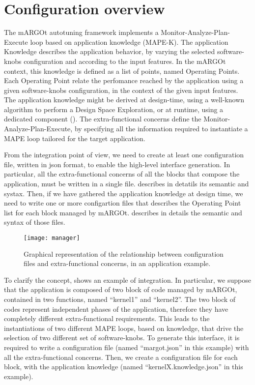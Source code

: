 \section{Configuration overview}
The mARGOt autotuning framework implements a Monitor-Analyze-Plan-Execute loop based on application knowledge (MAPE-K).
The application Knowledge describes the application behavior, by varying the selected software-knobs configuration and according to the input features.
In the mARGOt context, this knowledge is defined as a list of points, named Operating Points.
Each Operating Point relate the perfomance reached by the application using a given software-knobs configuration, in the context of the given input features.
The application knowledge might be derived at design-time, using a well-known algorithm to perform a Design Space Exploration, or at runtime, using a dedicated component ().
The extra-functional concerns define the Monitor-Analyze-Plan-Execute, by specifying all the information required to instantiate a MAPE loop tailored for the target application.


From the integration point of view, we need to create at least one configuration file, written in json format, to enable the high-level interface generation.
In particular, all the extra-functional concerns of all the blocks that compose the application, must be written in a single file.
 describes in detatils its semantic and systax.
Then, if we have gathered the application knowledge at design time, we need to write one or more configartion files that describes the Operating Point list for each block managed by mARGOt.
 describes in details the semantic and syntax of those files.

\begin{figure}
\centering
\texttt{[image: manager]}
\caption{Graphical representation of the relationship between configuration files and extra-functional concerns, in an application example.}
\label{fig:manager}
\end{figure}


To clarify the concept,  shows an example of integration.
In particular, we suppose that the application is composed of two block of code managed by mARGOt, contained in two functions, named ``kernel1'' and ``kernel2''.
The two block of codes represent independent phases of the application, therefore they have completely different extra-functional requirements.
This leads to the instantiations of two different MAPE loops, based on knowledge, that drive the selection of two different set of software-knobs.
To generate this interface, it is required to write a configuration file (named ``margot.json'' in this example) with all the extra-functional concerns.
Then, we create a configuration file for each block, with the application knowledge (named ``kernelX.knowledge.json'' in this example).
